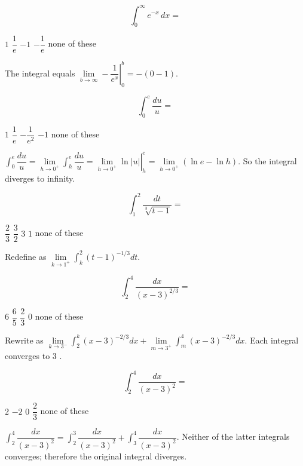 \question
\[
\int_{0}^{\infty} e^{-x}\,dx=
\]
\begin{choices}
  \CorrectChoice $1$
  \choice $\dfrac{1}{e}$
  \choice $-1$
  \choice $-\dfrac{1}{e}$
  \choice none of these
\end{choices}
\begin{solution}
The integral equals $\lim\limits_{b \to \infty}-\left.\dfrac{1}{e^{x}}\right|_{0} ^{b}=-(0-1)$.
\end{solution}

\question
\[
\int_{0}^{e} \dfrac{d u}{u}=
\]
\begin{choices}
  \choice $1$
  \choice $\dfrac{1}{e}$
  \choice $-\dfrac{1}{e^{2}}$
  \choice $-1$
  \CorrectChoice none of these
\end{choices}
\begin{solution}
$\int_{0}^{e} \dfrac{d u}{u}=\lim\limits_{h \to 0^{+}} \int_{h}^{e} \dfrac{d u}{u}=\left.\lim\limits_{h \to 0^{+}} \ln |u|\right|_{h} ^{e}=\lim\limits_{h \to 0^{+}}(\ln e-\ln h)$. So the integral diverges to infinity.
\end{solution}




\newpage



\question
\[
\int_{1}^{2} \dfrac{d t}{\sqrt[3]{t-1}}=
\]
\begin{choices}
  \choice $\dfrac{2}{3}$
  \CorrectChoice $\dfrac{3}{2}$
  \choice $3$
  \choice $1$
  \choice none of these
\end{choices}
\begin{solution}
Redefine as $\lim\limits_{k \to 1^{+}} \int_{k}^{2}(t-1)^{-1 / 3} d t$.
\end{solution}

\question
\[
\int_{2}^{4} \dfrac{d x}{(x-3)^{2 / 3}}=
\]
\begin{choices}
  \CorrectChoice $6$
  \choice $\dfrac{6}{5}$
  \choice $\dfrac{2}{3}$
  \choice $0$
  \choice none of these
\end{choices}
\begin{solution}
Rewrite as $\lim\limits_{k \to 3^{-}} \int_{2}^{k}(x-3)^{-2 / 3} d x+\lim\limits_{m \to 3^{+}} \int_{m}^{4}(x-3)^{-2 / 3} d x$. Each integral converges to 3 .
\end{solution}

\question
\[
\int_{2}^{4} \dfrac{d x}{(x-3)^{2}}=
\]
\begin{choices}
  \choice $2$
  \choice $-2$
  \choice $0$
  \choice $\dfrac{2}{3}$
  \CorrectChoice none of these
\end{choices}
\begin{solution}
$\int_{2}^{4} \dfrac{d x}{(x-3)^{2}}=\int_{2}^{3} \dfrac{d x}{(x-3)^{2}}+\int_{3}^{4} \dfrac{d x}{(x-3)^{2}}$. Neither of the latter integrals converges; therefore the original integral diverges.
\end{solution}




